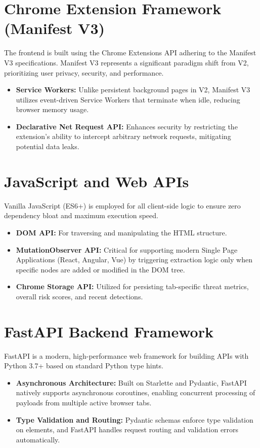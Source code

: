 \section{Chrome Extension Framework (Manifest V3)}
The frontend is built using the Chrome Extensions API adhering to the Manifest V3 specifications. Manifest V3 represents a significant paradigm shift from V2, prioritizing user privacy, security, and performance. 
\begin{itemize}
    \item \textbf{Service Workers:} Unlike persistent background pages in V2, Manifest V3 utilizes event-driven Service Workers that terminate when idle, reducing browser memory usage.
    \item \textbf{Declarative Net Request API:} Enhances security by restricting the extension's ability to intercept arbitrary network requests, mitigating potential data leaks.
\end{itemize}

\section{JavaScript and Web APIs}
Vanilla JavaScript (ES6+) is employed for all client-side logic to ensure zero dependency bloat and maximum execution speed. 
\begin{itemize}
    \item \textbf{DOM API:} For traversing and manipulating the HTML structure.
    \item \textbf{MutationObserver API:} Critical for supporting modern Single Page Applications (React, Angular, Vue) by triggering extraction logic only when specific nodes are added or modified in the DOM tree.
    \item \textbf{Chrome Storage API:} Utilized for persisting tab-specific threat metrics, overall risk scores, and recent detections.
\end{itemize}

\section{FastAPI Backend Framework}
FastAPI is a modern, high-performance web framework for building APIs with Python 3.7+ based on standard Python type hints.
\begin{itemize}
    \item \textbf{Asynchronous Architecture:} Built on Starlette and Pydantic, FastAPI natively supports asynchronous coroutines, enabling concurrent processing of payloads from multiple active browser tabs.
    \item \textbf{Type Validation and Routing:} Pydantic schemas enforce type validation on elements, and FastAPI handles request routing and validation errors automatically.
\end{itemize}

